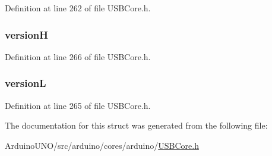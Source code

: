 Definition at line 262 of file U\+S\+B\+Core.\+h.

\hypertarget{struct_h_i_d_desc_descriptor_a25c3b37fcec9c0b6cd0b3aaa62c904f0}{}
\subsubsection[{version\+H}]{ version\+H}\label{struct_h_i_d_desc_descriptor_a25c3b37fcec9c0b6cd0b3aaa62c904f0}


Definition at line 266 of file U\+S\+B\+Core.\+h.

\hypertarget{struct_h_i_d_desc_descriptor_abbe47c1ab026892a2d5ed0c8690f63c4}{}
\subsubsection[{version\+L}]{ version\+L}\label{struct_h_i_d_desc_descriptor_abbe47c1ab026892a2d5ed0c8690f63c4}


Definition at line 265 of file U\+S\+B\+Core.\+h.



The documentation for this struct was generated from the following file\+:\begin{DoxyCompactItemize}
\item 
Arduino\+U\+N\+O/src/arduino/cores/arduino/\hyperlink{_u_s_b_core_8h}{U\+S\+B\+Core.\+h}\end{DoxyCompactItemize}
